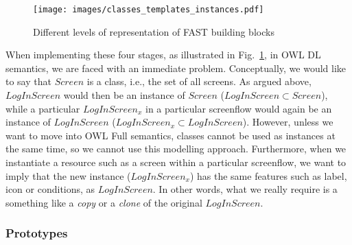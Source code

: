 \documentclass{article}
\begin{document}
\begin{figure}
  \begin{center}
    \texttt{[image: images/classes\_templates\_instances.pdf]}
    \caption{Different levels of representation of FAST building blocks}
    \label{fig:classes_templates}
  \end{center}
\end{figure}

When implementing these four stages, as illustrated in Fig.~\ref{fig:classes_templates}, in OWL DL semantics, we are faced with an immediate problem. Conceptually, we would like to say that $Screen$ is a class, i.e., the set of all screens. As argued above, $LogInScreen$ would then be an instance of $Screen$ ($LogInScreen \subset Screen$), while a particular $LogInScreen_x$ in a particular screenflow would again be an instance of $LogInScreen$ ($LogInScreen_x \subset LogInScreen$). However, unless we want to move into OWL Full semantics, classes cannot be used as instances at the same time, so we cannot use this modelling approach. Furthermore, when we instantiate a resource such as a screen within a particular screenflow, we want to imply that the new instance ($LogInScreen_x$) has the same features such as label, icon or conditions, as $LogInScreen$. In other words, what we really require is a something like a \emph{copy} or a \emph{clone} of the original $LogInScreen$. 

\subsubsection{Prototypes} %
\label{ssub:prototypes}
\end{document}
